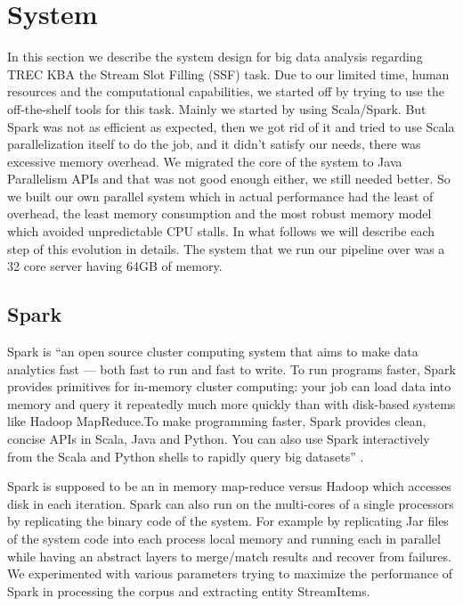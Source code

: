 
\section{System}

In this section we describe the system design for big data analysis regarding TREC KBA the Stream Slot Filling (SSF) task. Due to our limited time, human resources and the computational capabilities, we started off by trying to use the off-the-shelf tools for this task. Mainly we started by using Scala/Spark. But Spark was not as efficient as expected, then we got rid of it and tried to use Scala parallelization itself to do the job, and it didn’t satisfy our needs, there was excessive memory overhead. We migrated the core of the system to Java Parallelism APIs and that was not good enough either, we still needed better. So we built our own parallel system which in actual performance had the least of overhead, the least memory consumption and  the most robust memory model which avoided unpredictable CPU stalls. In what follows we will describe each step of this evolution in details. The system that we run our pipeline over was a 32 core server having 64GB of memory.

\subsection{Spark}

Spark is “an open source cluster computing system that aims to make data analytics fast — both fast to run and fast to write. To run programs faster, Spark provides primitives for in-memory cluster computing: your job can load data into memory and query it repeatedly much more quickly than with disk-based systems like Hadoop MapReduce.To make programming faster, Spark provides clean, concise APIs in Scala, Java and Python. You can also use Spark interactively from the Scala and Python shells to rapidly query big datasets” \cite{ferc11}. 

Spark is supposed to be an in memory map-reduce versus Hadoop which accesses disk in each iteration. Spark can also run on the multi-cores of a single processors by replicating the binary code of the system. For example by replicating Jar files of the system code into each process local memory and running each in parallel while having an abstract layers to merge/match results and recover from failures. We experimented with various parameters trying to maximize the performance of Spark in processing the corpus and extracting entity StreamItems. 

